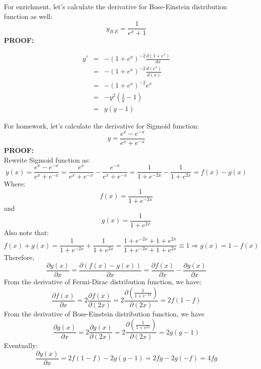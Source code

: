 \noindent{\color{black} \rule{\linewidth}{0.5mm}}
For enrichment, let's calculate the derivative for Bose-Einstein distribution function as well:
\[y_{B.E} = \frac{1}{{{e^x} + 1}}\]\pushQED{\qed} 
\textbf{PROOF:}

\[\begin{array}{*{20}{c}}
{y'}& = &{ - {{\left( {1 + {e^x}} \right)}^{ - 2}}\frac{{d\left( {1 + {e^x}} \right)}}{{dx}}}\\
{}& = &{ - {{\left( {1 + {e^x}} \right)}^{ - 2}}\frac{{d\left( {{e^x}} \right)}}{{d\left( x \right)}}}\\
{}& = &{ - {{\left( {1 + {e^x}} \right)}^{ - 2}}{e^x}}\\
{}& = &{ - {y^2}\left( {\frac{1}{y} - 1} \right)}\\
{}& = &{y\left( {y - 1} \right)}
\end{array}\]\qedhere


\noindent{\color{black} \rule{\linewidth}{0.5mm}}
For homework, let's calculate the derivative for Sigmoid function:
\[y = \frac{{{e^x} - {e^{ - x}}}}{{{e^x} + {e^{ - x}}}}\]
\textbf{PROOF:}\\
Rewrite Sigmoid function as:
\[y\left( x \right) = \frac{{{e^x} - {e^{ - x}}}}{{{e^x} + {e^{ - x}}}} = \frac{{{e^x}}}{{{e^x} + {e^{ - x}}}} - \frac{{{e^{ - x}}}}{{{e^x} + {e^{ - x}}}} = \frac{1}{{1 + {e^{ - 2x}}}} - \frac{1}{{1 + {e^{2x}}}} = f\left( x \right) - g\left( x \right)\]
Where:
\[f\left( x \right) = \frac{1}{{1 + {e^{ - 2x}}}}\]
and
\[g\left( x \right) = \frac{1}{{1 + {e^{2x}}}}\]
Also note that:
\[f\left( x \right) + g\left( x \right) = \frac{1}{{1 + {e^{ - 2x}}}} + \frac{1}{{1 + {e^{2x}}}} = \frac{{1 + {e^{ - 2x}} + 1 + {e^{2x}}}}{{1 + {e^{ - 2x}} + 1 + {e^{2x}}}} \equiv 1 \Rightarrow g\left( x \right) = 1 - f\left( x \right)\]
Therefore,
\[\frac{{\partial y\left( x \right)}}{{\partial x}} = \frac{{\partial \left( {f\left( x \right) - g\left( x \right)} \right)}}{{\partial x}} = \frac{{\partial f\left( x \right)}}{{\partial x}} - \frac{{\partial g\left( x \right)}}{{\partial x}}\]
From the derivative of Fermi-Dirac distribution function, we have:
\[\frac{{\partial f\left( x \right)}}{{\partial x}} = 2\frac{{\partial f\left( x \right)}}{{\partial \left( {2x} \right)}} = 2\frac{{\partial \left( {\frac{1}{{1 + {e^{ - 2x}}}}} \right)}}{{\partial \left( {2x} \right)}} = 2f\left( {1 - f} \right)\]
From the derivative of  Bose-Einstein distribution function, we have
\[\frac{{\partial g\left( x \right)}}{{\partial x}} = 2\frac{{\partial g\left( x \right)}}{{\partial \left( {2x} \right)}} = 2\frac{{\partial \left( {\frac{1}{{1 + {e^{2x}}}}} \right)}}{{\partial \left( {2x} \right)}} = 2g\left( {g - 1} \right)\]
Eventually:
\[\frac{{\partial y\left( x \right)}}{{\partial x}} = 2f\left( {1 - f} \right) - 2g\left( {g - 1} \right) = 2fg - 2g\left( { - f} \right) = 4fg\]
